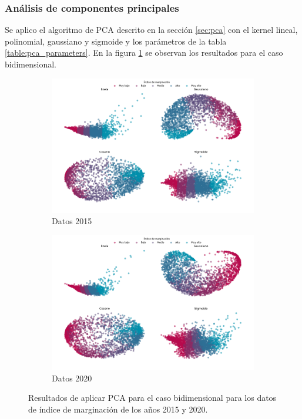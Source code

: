 \subsubsection{Análisis de componentes principales}

Se aplico el algoritmo de PCA descrito en la sección \ref{sec:pca} con el kernel lineal, polinomial, gaussiano y sigmoide y los parámetros de la tabla \ref{table:pca_parameters}. En la figura \ref{fig:PCA_2d} se observan los resultados para el caso bidimensional.

\begin{figure}[H]
    \centering
    \begin{subfigure}{8.4cm}
        \includegraphics[width=1\linewidth]{Graphics/Data_2015/PCA_2D.png}
        \caption{Datos 2015}
    \end{subfigure}
    \begin{subfigure}{8.4cm}
        \includegraphics[width=1\linewidth]{Graphics/Data_2020/PCA_2D.png}
        \caption{Datos 2020}
    \end{subfigure}
    \caption{Resultados de aplicar PCA para el caso bidimensional para los datos de índice de marginación de los años 2015 y 2020.}
    \label{fig:PCA_2d}
\end{figure}

